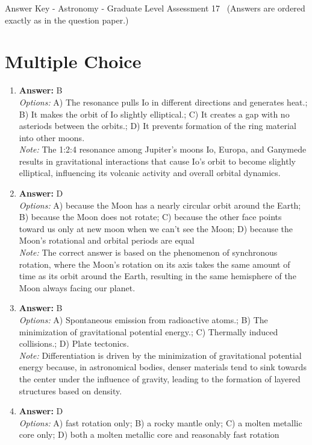 \documentclass[12pt]{article}
\begin{document}
\begin{center}
Answer Key - Astronomy - Graduate Level Assessment 17 \
\small (Answers are ordered exactly as in the question paper.)
\end{center}

\section*{Multiple Choice}
\begin{enumerate}[label=\arabic*.]
\item \textbf{Answer:} B
\\ \textit{Options:} A) The resonance pulls Io in different directions and generates heat.; B) It makes the orbit of Io slightly elliptical.; C) It creates a gap with no asteriods between the orbits.; D) It prevents formation of the ring material into other moons.
\\ \textit{Note:} The 1:2:4 resonance among Jupiter's moons Io, Europa, and Ganymede results in gravitational interactions that cause Io's orbit to become slightly elliptical, influencing its volcanic activity and overall orbital dynamics.
\item \textbf{Answer:} D
\\ \textit{Options:} A) because the Moon has a nearly circular orbit around the Earth; B) because the Moon does not rotate; C) because the other face points toward us only at new moon when we can't see the Moon; D) because the Moon's rotational and orbital periods are equal
\\ \textit{Note:} The correct answer is based on the phenomenon of synchronous rotation, where the Moon's rotation on its axis takes the same amount of time as its orbit around the Earth, resulting in the same hemisphere of the Moon always facing our planet.
\item \textbf{Answer:} B
\\ \textit{Options:} A) Spontaneous emission from radioactive atoms.; B) The minimization of gravitational potential energy.; C) Thermally induced collisions.; D) Plate tectonics.
\\ \textit{Note:} Differentiation is driven by the minimization of gravitational potential energy because, in astronomical bodies, denser materials tend to sink towards the center under the influence of gravity, leading to the formation of layered structures based on density.
\item \textbf{Answer:} D
\\ \textit{Options:} A) fast rotation only; B) a rocky mantle only; C) a molten metallic core only; D) both a molten metallic core and reasonably fast rotation

\end{enumerate}
\end{document}
